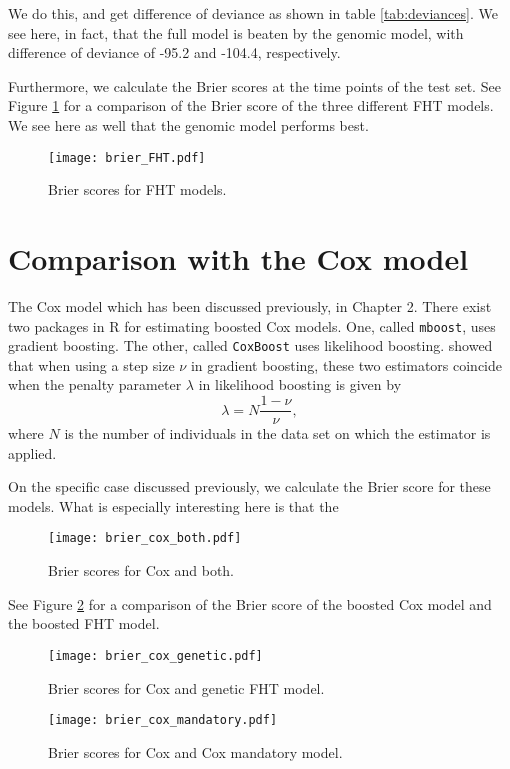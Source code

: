 We do this, and get difference of deviance as shown in table \ref{tab:deviances}.
We see here, in fact, that the full model is beaten by the genomic model, with difference of deviance of -95.2 and -104.4, respectively.

Furthermore, we calculate the Brier scores at the time points of the test set.
See Figure \ref{fig:brier-FHT} for a comparison of the Brier score of the three different FHT models.
We see here as well that the genomic model performs best.

\begin{figure}
\caption{Brier scores for FHT models.}
\label{fig:brier-FHT}
\centering\texttt{[image: brier\_FHT.pdf]}
\end{figure}

\section{Comparison with the Cox model}
The Cox model which has been discussed previously, in Chapter 2.
There exist two packages in R for estimating boosted Cox models.
One, called \verb|mboost|, uses gradient boosting.
The other, called \verb|CoxBoost| uses likelihood boosting.
\citet{DeBin2016} showed that when using a step size $\nu$ in gradient boosting, these two estimators coincide when the penalty parameter $\lambda$ in likelihood boosting is given by
\begin{equation}\label{eq:lambda-nu}
    \lambda=N\frac{1-\nu}{\nu},
\end{equation}
where $N$ is the number of individuals in the data set on which the estimator is applied.

On the specific case discussed previously, we calculate the Brier score for these models.
What is especially interesting here is that the 

\begin{figure}
\caption{Brier scores for Cox and both.}
\label{fig:brier-cox-both}
\centering\texttt{[image: brier\_cox\_both.pdf]}
\end{figure}
See Figure \ref{fig:brier-cox-both} for a comparison of the Brier score of the boosted Cox model and the boosted FHT model.
\begin{figure}
\caption{Brier scores for Cox and genetic FHT model.}
\label{fig:brier-cox-genetic}
\centering
\texttt{[image: brier\_cox\_genetic.pdf]}
\end{figure}

\begin{figure}
\caption{Brier scores for Cox and Cox mandatory model.}
\label{fig:brier-cox-mandatory}
\centering
\texttt{[image: brier\_cox\_mandatory.pdf]}
\end{figure}


